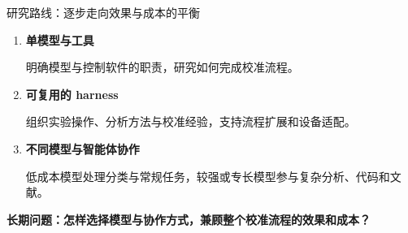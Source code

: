 \begin{frame}{研究路线：逐步走向效果与成本的平衡}
 \begin{enumerate}
  \item \textbf{单模型与工具}\par
  明确模型与控制软件的职责，研究如何完成校准流程。
  \item \textbf{可复用的 harness}\par
  组织实验操作、分析方法与校准经验，支持流程扩展和设备适配。
  \item \textbf{不同模型与智能体协作}\par
  低成本模型处理分类与常规任务，较强或专长模型参与复杂分析、代码和文献。
 \end{enumerate}
 \vspace{2mm}\par
 \textbf{长期问题：怎样选择模型与协作方式，兼顾整个校准流程的效果和成本？}
\end{frame}
